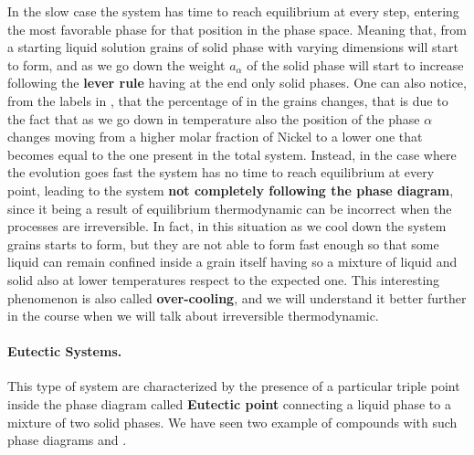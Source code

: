In the slow case the system has time to reach equilibrium at every step, entering the most favorable phase for that position in the phase space. Meaning that, from a starting liquid solution grains of solid phase with varying dimensions will start to form, and as we go down the weight $a_\alpha$ of the solid phase will start to increase following the \textbf{lever rule} having at the end only solid phases. One can also notice, from the labels in , that the percentage of  in the grains changes, that is due to the fact that as we go down in temperature also the position of the phase $\alpha$ changes moving from a higher molar fraction of Nickel to a lower one that becomes equal to the one present in the total system. Instead, in the case where the evolution goes fast the system has no time to reach equilibrium at every point, leading to the system \textbf{not completely following the phase diagram}, since it being a result of equilibrium thermodynamic can be incorrect when the processes are irreversible. In fact, in this situation as we cool down the system grains starts to form, but they are not able to form fast enough so that some liquid can remain confined inside a grain itself having so a mixture of liquid and solid also at lower temperatures respect to the expected one. This interesting phenomenon is also called \textbf{over-cooling}, and we will understand it better further in the course when we will talk about irreversible thermodynamic.

\paragraph{Eutectic Systems.} This type of system are characterized by the presence of a particular triple point inside the phase diagram called \textbf{Eutectic point} connecting a liquid phase to a mixture of two solid phases. We have seen two example of compounds with such phase diagrams  and .

